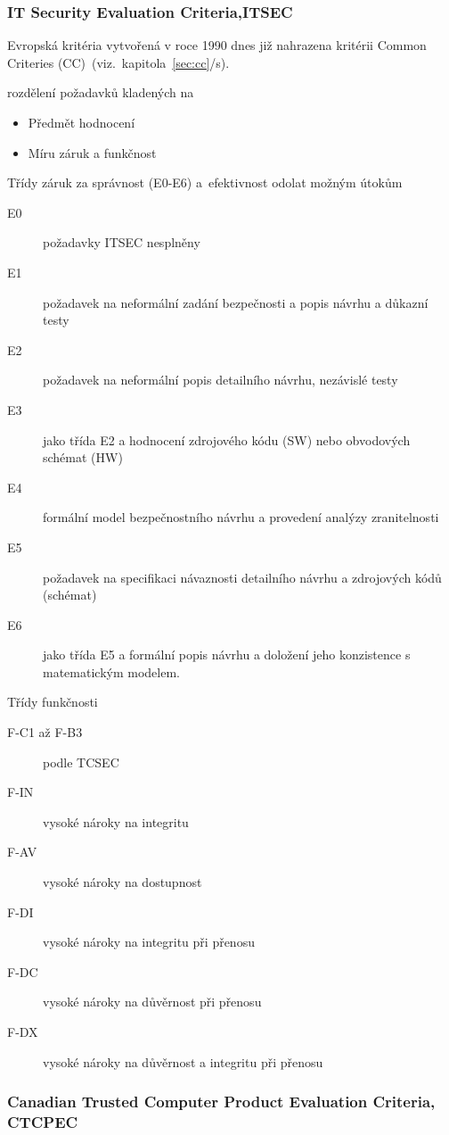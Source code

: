 \documentclass[a4paper,12pt]{article}
\newcommand{\odkazNaKapitolu}[1]{(viz.~kapitola~\ref{#1}/s\pageref{#1})}
\begin{document}
\subsubsection{IT Security Evaluation Criteria,ITSEC}\label{sec:ITSEC}

Evropská kritéria vytvořená v roce 1990 dnes již nahrazena kritérii Common Criteries (CC)~\odkazNaKapitolu{sec:cc}.

rozdělení požadavků kladených na
\begin{itemize}
 \item Předmět hodnocení
 \item Míru záruk a funkčnost
\end{itemize}
Třídy záruk za správnost (E0-E6) a~efektivnost odolat možným útokům~\cite{PrezentaceBIS}
\begin{description}
 \item[E0] požadavky ITSEC nesplněny
 \item[E1] požadavek na neformální zadání bezpečnosti a popis návrhu a důkazní testy
 \item[E2] požadavek na neformální popis detailního návrhu, nezávislé testy
 \item[E3] jako třída E2 a hodnocení zdrojového kódu (SW) nebo obvodových schémat (HW)
 \item[E4] formální model bezpečnostního návrhu a provedení analýzy zranitelnosti
 \item[E5] požadavek na specifikaci návaznosti detailního návrhu a zdrojových kódů (schémat)
 \item[E6] jako třída E5 a formální popis návrhu a doložení jeho konzistence s matematickým modelem. 
\end{description}

Třídy funkčnosti~\cite{PrezentaceBIS}
\begin{description}
\item[F-C1 až F-B3] podle TCSEC 
\item[F-IN] vysoké nároky na integritu
\item[F-AV] vysoké nároky na dostupnost
\item[F-DI] vysoké nároky na integritu při přenosu
\item[F-DC] vysoké nároky na důvěrnost při přenosu
\item[F-DX] vysoké nároky na důvěrnost a integritu při přenosu
\end{description}

\subsubsection{Canadian Trusted Computer Product Evaluation Criteria, CTCPEC}\label{sec:CTCPEC}
\end{document}
